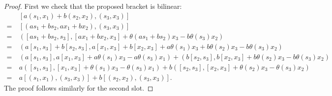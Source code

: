 \documentclass[12pt]{article}
\theoremstyle{definition}
\begin{document}
\begin{proof}
	First we check that the proposed bracket is bilinear: \begin{align*}
		    & [a(s_1, x_1) + b(s_2, x_2), (s_3, x_3)]                                                                                         \\
		=\  & [(as_1 + bs_2, ax_1 + bx_2), (s_3, x_3)]                                                                                        \\
		=\  & ([as_1 + bs_2, s_3], [ax_1 + bx_2, x_3] + \theta(as_1 + bs_2)x_3 - b\theta(s_3)x_2)                                             \\
		=\  & (a[s_1, s_3] + b[s_2, s_3], a[x_1, x_3] + b[x_2, x_3] + a\theta(s_1)x_3 + b\theta(s_2)x_3 - b\theta(s_3)x_2)                    \\
		=\  & (a[s_1, s_3], a[x_1, x_3] + a\theta(s_1)x_3 - a\theta(s_3)x_1) + (b[s_2, s_3], b[x_2, x_3] + b\theta(s_2)x_3 - b\theta(s_3)x_2) \\
		=\  & a([s_1, s_3], [x_1, x_3] + \theta(s_1)x_3 - \theta(s_3)x_1) + b([s_2, s_3], [x_2, x_3] + \theta(s_2)x_3 - \theta(s_3)x_2)       \\
		=\  & a[(s_1, x_1), (s_3, x_3)] + b[(s_2, x_2), (s_3, x_3)].
	\end{align*}
	The proof follows similarly for the second slot.


\end{proof}
\end{document}
